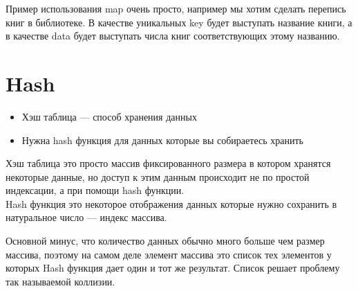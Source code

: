 \documentclass[12pt, twoside]{article}
\begin{document}
Пример использования map очень просто, например мы хотим сделать перепись книг в библиотеке. В качестве уникальных key будет выступать название книги, а в качестве data будет выступать числа книг соответствующих этому названию.

\section{Hash}
\begin{itemize}
	\item Хэш таблица --- способ хранения данных
	\item Нужна hash функция для данных которые вы собираетесь хранить
\end{itemize}

Хэш таблица это просто массив фиксированного размера в котором хранятся некоторые данные, но доступ к этим данным происходит не по простой индексации, а при помощи hash функции.\\

Hash функция это некоторое отображения данных которые нужно сохранить в натуральное число --- индекс массива.

Основной минус, что количество данных обычно много больше чем размер массива, поэтому на самом деле элемент массива это список тех элементов у которых Hash функция дает один и тот же результат. Список решает проблему так называемой коллизии.
\end{document}
